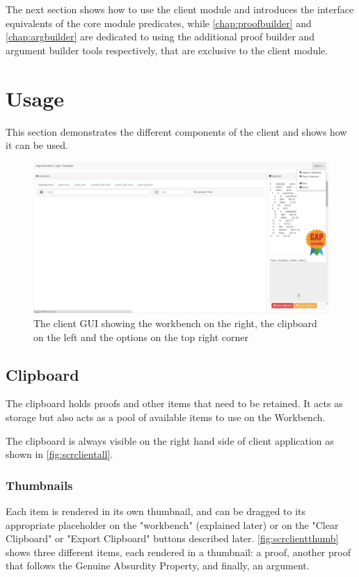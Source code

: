 \documentclass[11pt,twoside,a4paper]{report}
\begin{document}
The next section shows how to use the client module and introduces the interface equivalents of the core module predicates, while \autoref{chap:proofbuilder} and \autoref{chap:argbuilder} are dedicated to using the additional proof builder and argument builder tools respectively, that are exclusive to the client module.

\section{Usage}
This section demonstrates the different components of the client and shows how it can be used.

\begin{figure}[htp]
\centerline{\includegraphics[scale=0.3,angle=90]{img/scr-client-all.png}}
\caption{The client GUI showing the workbench on the right, the clipboard on the left and the options on the top right corner\label{fig:scrclientall}}
\end{figure}

\subsection{Clipboard}
The clipboard holds proofs and other items that need to be retained. It acts as storage but also acts as a pool of available items to use on the Workbench.

The clipboard is always visible on the right hand side of client application as shown in \autoref{fig:scrclientall}.

\subsubsection{Thumbnails}
Each item is rendered in its own thumbnail, and can be dragged to its appropriate placeholder on the "workbench" (explained later) or on the "Clear Clipboard" or "Export Clipboard" buttons described later. \autoref{fig:scrclientthumb} shows three different items, each rendered in a thumbnail: a proof, another proof that follows the Genuine Absurdity Property, and finally, an argument.
\end{document}
